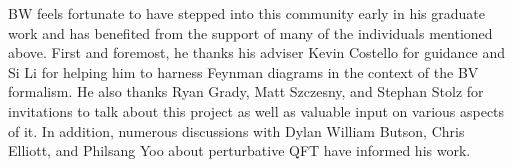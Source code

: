 BW feels fortunate to have stepped into this community early in his graduate work and has benefited from the support of many of the individuals mentioned above. First and foremost, he thanks his adviser Kevin Costello for guidance and Si Li for helping him to harness Feynman diagrams in the context of the BV formalism. He also thanks Ryan Grady, Matt Szczesny, and Stephan Stolz for invitations to talk about this project as well as valuable input on various aspects of it. In addition, numerous discussions with Dylan William Butson, Chris Elliott, and Philsang Yoo about perturbative QFT have informed his work. 
